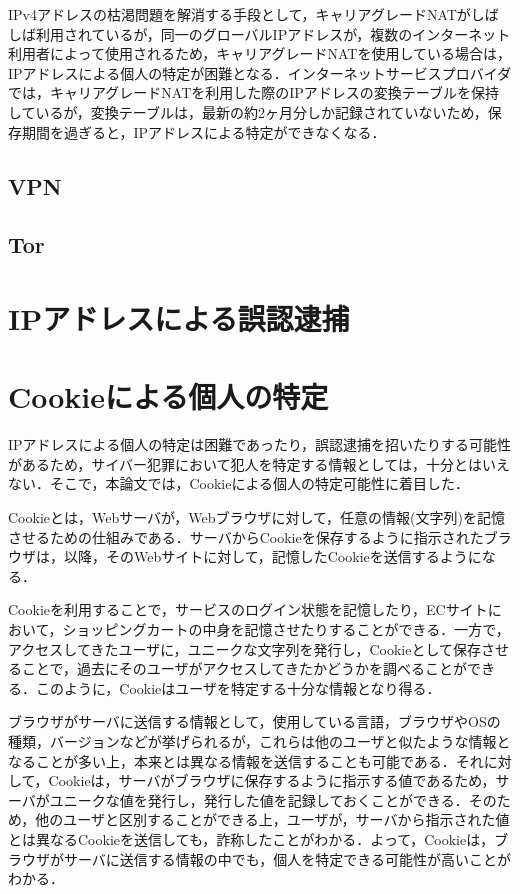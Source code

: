 \documentclass[10pt, a4paper]{jreport}
\begin{document}
IPv4アドレスの枯渇問題を解消する手段として，キャリアグレードNATがしばしば利用されているが，同一のグローバルIPアドレスが，複数のインターネット利用者によって使用されるため，キャリアグレードNATを使用している場合は，IPアドレスによる個人の特定が困難となる．インターネットサービスプロバイダでは，キャリアグレードNATを利用した際のIPアドレスの変換テーブルを保持しているが，変換テーブルは，最新の約2ヶ月分しか記録されていないため，保存期間を過ぎると，IPアドレスによる特定ができなくなる．

\subsection{VPN}

\subsection{Tor}

\section{IPアドレスによる誤認逮捕}

\section{Cookieによる個人の特定}
IPアドレスによる個人の特定は困難であったり，誤認逮捕を招いたりする可能性があるため，サイバー犯罪において犯人を特定する情報としては，十分とはいえない．そこで，本論文では，Cookieによる個人の特定可能性に着目した．

Cookieとは，Webサーバが，Webブラウザに対して，任意の情報(文字列)を記憶させるための仕組みである．サーバからCookieを保存するように指示されたブラウザは，以降，そのWebサイトに対して，記憶したCookieを送信するようになる．

Cookieを利用することで，サービスのログイン状態を記憶したり，ECサイトにおいて，ショッピングカートの中身を記憶させたりすることができる．一方で，アクセスしてきたユーザに，ユニークな文字列を発行し，Cookieとして保存させることで，過去にそのユーザがアクセスしてきたかどうかを調べることができる．このように，Cookieはユーザを特定する十分な情報となり得る．

ブラウザがサーバに送信する情報として，使用している言語，ブラウザやOSの種類，バージョンなどが挙げられるが，これらは他のユーザと似たような情報となることが多い上，本来とは異なる情報を送信することも可能である．それに対して，Cookieは，サーバがブラウザに保存するように指示する値であるため，サーバがユニークな値を発行し，発行した値を記録しておくことができる．そのため，他のユーザと区別することができる上，ユーザが，サーバから指示された値とは異なるCookieを送信しても，詐称したことがわかる．よって，Cookieは，ブラウザがサーバに送信する情報の中でも，個人を特定できる可能性が高いことがわかる．
\end{document}
